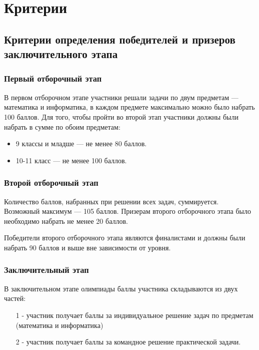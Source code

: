 \part{Критерии}
\chapter{Критерии определения победителей и призеров заключительного этапа}
 
\section{Первый отборочный этап}
 
В первом отборочном этапе участники решали задачи по двум предметам — математика и информатика, в каждом предмете максимально можно было набрать 100 баллов. Для того, чтобы пройти во второй этап участники должны были набрать в сумме по обоим предметам:
\begin{itemize}
    \item 9 классы и младше — не менее 80 баллов.
    \item 10-11 класс — не менее 100 баллов.
\end{itemize}

\section{Второй отборочный этап}

Количество баллов, набранных при решении всех задач, суммируется. Возможный максимум — 105 баллов. Призерам второго отборочного этапа было необходимо набрать не менее 20 баллов.

Победители второго отборочного этапа являются финалистами и должны были набрать 90 баллов и выше вне зависимости от уровня.

\section{Заключительный этап}

В заключительном этапе олимпиады баллы участника складываются из двух частей: 
\begin{enumerate}
    \item[1 -] участник получает баллы за индивидуальное решение задач по предметам (математика и информатика)
    \item[2 -] участник получает баллы за командное решение практической задачи.
\end{enumerate} 

